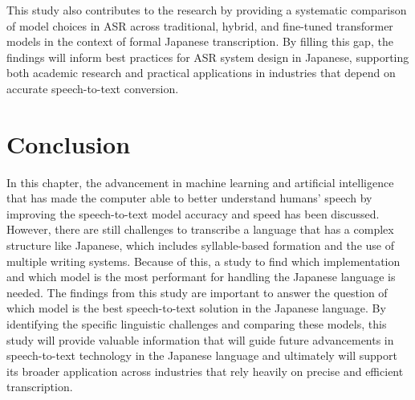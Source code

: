 This study also contributes to the research by providing a systematic comparison of model choices in ASR across traditional, hybrid, and fine-tuned transformer models in the context of formal Japanese transcription. By filling this gap, the findings will inform best practices for ASR system design in Japanese, supporting both academic research and practical applications in industries that depend on accurate speech-to-text conversion.

\section{Conclusion}
In this chapter, the advancement in machine learning and artificial intelligence that has made the computer able to better understand humans' speech by improving the speech-to-text model accuracy and speed has been discussed. However, there are still challenges to transcribe a language that has a complex structure like Japanese, which includes syllable-based formation and the use of multiple writing systems. Because of this, a study to find which implementation and which model is the most performant for handling the Japanese language is needed. The findings from this study are important to answer the question of which model is the best speech-to-text solution in the Japanese language. By identifying the specific linguistic challenges and comparing these models, this study will provide valuable information that will guide future advancements in speech-to-text technology in the Japanese language and ultimately will support its broader application across industries that rely heavily on precise and efficient transcription.
